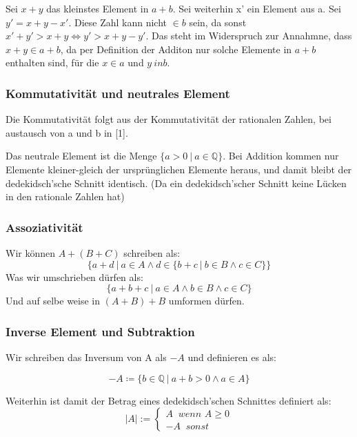 \documentclass[12pt]{article}
\begin{document}
    Sei $x + y$ das kleinstes Element in $a + b$. Sei weiterhin x' ein Element aus a.
    Sei $y' = x + y - x'$. Diese Zahl kann nicht $\in b$ sein, da sonst $x' + y' > x + y \Leftrightarrow y' > x + y - y'$.
    Das steht im Widerspruch zur Annahmne, dass $x + y \in a + b$, da per Definition der Additon nur solche Elemente
    in $a + b$ enthalten sind, für die $x \in a$ und $y \ in b$.

    \subsubsection{Kommutativität und neutrales Element}

    Die Kommutativität folgt aus der Kommutativität der rationalen Zahlen, bei austausch von a und b in [1].

    Das neutrale Element ist die Menge $\{a > 0 \mspace{4mu} | \mspace{4mu} a \in \mathbb{Q}\}$.
    Bei Addition kommen nur Elemente kleiner-gleich der ursprünglichen Elemente heraus, und damit bleibt
    der dedekidsch'sche Schnitt identisch.
    (Da ein dedekidsch'scher Schnitt keine Lücken in den rationale Zahlen hat)

    \subsubsection{Assoziativität}

    Wir können $A+(B+C)$ schreiben als:
    \[\{a+d \mspace{4mu} | \mspace{4mu} a \in A \land d \in \{b + c \mspace{4mu} | \mspace{4mu} b \in B \land c \in C\}\}\]
    Was wir umschrieben dürfen als:
    \[\{a+b+c \mspace{4mu} | \mspace{4mu} a \in A \land b \in B \land c \in C\}\]
    Und auf selbe weise in $(A+B)+B$ umformen dürfen.

    \subsubsection{Inverse Element und Subtraktion}

    Wir schreiben das Inversum von A als $-A$ und definieren es als:

    \[-A \coloneqq \{b \in \mathbb{Q} \mspace{4mu} | \mspace{4mu} a + b > 0 \land a \in A\}\]



    Weiterhin ist damit der Betrag eines dedekidsch'schen Schnittes definiert als:
    \[|A| := \begin{cases}A \mspace{10mu} wenn \mspace{6mu} A \ge 0 \\ -A \mspace{10mu} sonst\end{cases}\]
\end{document}
